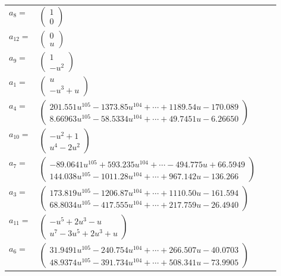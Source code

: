 \documentclass[1p]{elsarticle_modified}
\theoremstyle{definition}
\begin{document}
\begin{tabular}{m{7pt} m{180pt} m{7pt} m{180pt} }
\flushright $a_{8}=$&$\begin{pmatrix}1\\0\end{pmatrix}$ \\
\flushright $a_{12}=$&$\begin{pmatrix}0\\u\end{pmatrix}$ \\
\flushright $a_{9}=$&$\begin{pmatrix}1\\- u^2\end{pmatrix}$ \\
\flushright $a_{1}=$&$\begin{pmatrix}u\\- u^3+u\end{pmatrix}$ \\
\flushright $a_{4}=$&$\begin{pmatrix}201.551 u^{105}-1373.85 u^{104}+\cdots+1189.54 u-170.089\\8.66963 u^{105}-58.5334 u^{104}+\cdots+49.7451 u-6.26650\end{pmatrix}$ \\
\flushright $a_{10}=$&$\begin{pmatrix}- u^2+1\\u^4-2 u^2\end{pmatrix}$ \\
\flushright $a_{7}=$&$\begin{pmatrix}-89.0641 u^{105}+593.235 u^{104}+\cdots-494.775 u+66.5949\\144.038 u^{105}-1011.28 u^{104}+\cdots+967.142 u-136.266\end{pmatrix}$ \\
\flushright $a_{3}=$&$\begin{pmatrix}173.819 u^{105}-1206.87 u^{104}+\cdots+1110.50 u-161.594\\68.8034 u^{105}-417.555 u^{104}+\cdots+217.759 u-26.4940\end{pmatrix}$ \\
\flushright $a_{11}=$&$\begin{pmatrix}- u^5+2 u^3- u\\u^7-3 u^5+2 u^3+u\end{pmatrix}$ \\
\flushright $a_{6}=$&$\begin{pmatrix}31.9491 u^{105}-240.754 u^{104}+\cdots+266.507 u-40.0703\\48.9374 u^{105}-391.734 u^{104}+\cdots+508.341 u-73.9905\end{pmatrix}$ \\

\end{tabular}
\end{document}
